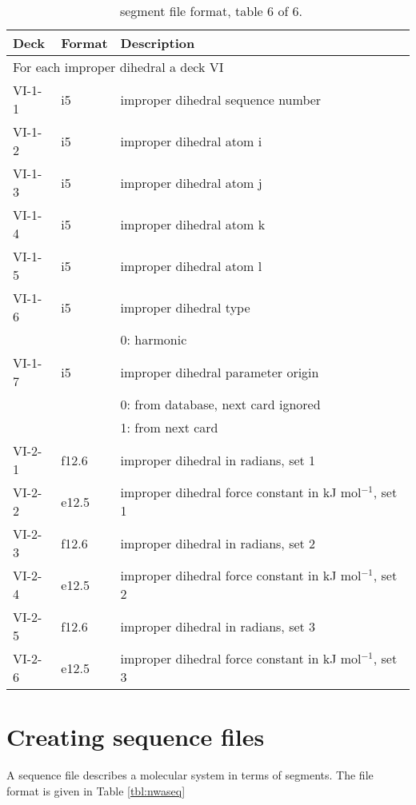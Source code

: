 \begin{table}[htbp]
\begin{center}
\begin{tabular*}{150mm}{p{15mm}p{12mm}l}
\hline\hline
Deck & Format & Description \\ \hline
\multicolumn{3}{l}{For each improper dihedral a deck VI} \\
VI-1-1 & i5     & improper dihedral sequence number \\
VI-1-2 & i5     & improper dihedral atom i \\
VI-1-3 & i5     & improper dihedral atom j \\
VI-1-4 & i5     & improper dihedral atom k \\
VI-1-5 & i5     & improper dihedral atom l \\
VI-1-6 & i5     & improper dihedral type \\
       &        & 0: harmonic\\
VI-1-7 & i5     & improper dihedral parameter origin\\
       &        & 0: from database, next card ignored \\
       &        & 1: from next card\\
VI-2-1 & f12.6  & improper dihedral in radians, set 1\\
VI-2-2 & e12.5  & improper dihedral force constant in kJ mol$^{-1}$, set 1 \\
VI-2-3 & f12.6  & improper dihedral in radians, set 2\\
VI-2-4 & e12.5  & improper dihedral force constant in kJ mol$^{-1}$, set 2 \\
VI-2-5 & f12.6  & improper dihedral in radians, set 3\\
VI-2-6 & e12.5  & improper dihedral force constant in kJ mol$^{-1}$, set 3 \\
\hline\hline
\end{tabular*}
\caption{\nwargos\ segment file format, table 6 of 6.\label{tbl:nwaseg6}}
\end{center}
\end{table}


\section{Creating sequence files}
A sequence file describes a molecular system in terms of segments. The
file format is given in Table \ref{tbl:nwaseq}

